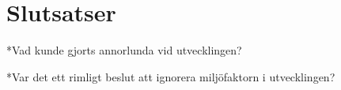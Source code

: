 \section{Slutsatser}
\label{sec:Lieth_Wahid-conclusion}

*Vad kunde gjorts annorlunda vid utvecklingen?


*Var det ett rimligt beslut att ignorera miljöfaktorn i utvecklingen?
